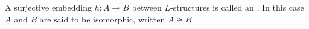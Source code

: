 A surjective embedding $h: A \to B$ between $L$-structures is called an . In this case $A$ and $B$ are said to be isomorphic, written $A \cong B$.
